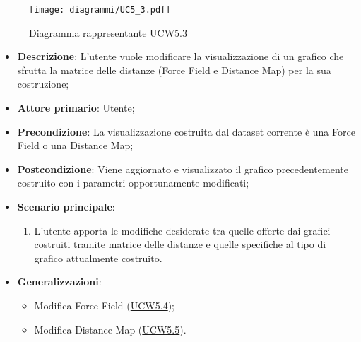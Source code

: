 \begin{figure}[h]
    \centering
    \texttt{[image: diagrammi/UC5\_3.pdf]}
    \caption{Diagramma rappresentante UCW5.3}
    \label{fig:UCW5.3}
\end{figure}

\begin{itemize}
    \item \textbf{Descrizione}: L’utente vuole modificare la visualizzazione di un grafico che sfrutta la matrice delle
          distanze (Force Field e Distance Map) per la sua costruzione;
    \item \textbf{Attore primario}: Utente;
    \item \textbf{Precondizione}: La visualizzazione costruita dal dataset corrente è una Force Field o una Distance Map;
    \item \textbf{Postcondizione}: Viene aggiornato e visualizzato il grafico precedentemente costruito con i parametri opportunamente modificati;
    \item \textbf{Scenario principale}:
          \begin{enumerate}
              \item L’utente apporta le modifiche desiderate tra quelle offerte dai grafici costruiti tramite matrice delle
                    distanze e quelle specifiche al tipo di grafico attualmente costruito.
          \end{enumerate}
    \item \textbf{Generalizzazioni}:
          \begin{itemize}
              \item Modifica Force Field (\hyperref[ssub:ucw5.4]{UCW5.4});
              \item Modifica Distance Map (\hyperref[ssub:ucw5.5]{UCW5.5}).
          \end{itemize}
\end{itemize}

